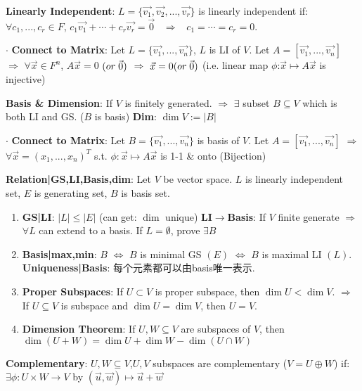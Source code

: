 \documentclass[9pt]{article}
\begin{document}
\textbf{Linearly Independent}: $L=\{\vec{v_1},\vec{v_2},...,\vec{v_r}\}$ is linearly independent if: \ $\forall c_1,...,c_r\in F$, $c_1\vec{v_1}+\cdots+c_r\vec{v_r}=\vec{0}$ \ $\Rightarrow$ \ $c_1=\cdots =c_r=0$.

$\cdot$ \textbf{Connect to Matrix}: {\footnotesize Let $L=\{\vec{v_1},...,\vec{v_n}\}$, $L$ is LI of $V$. Let $A=[\vec{v_1},...,\vec{v_n}]$ $\Rightarrow$ $\forall\vec{x}\in F^n$, $A\vec{x}=0$ ${\scriptsize (or \ \vec{0})}$ $\Rightarrow$ $\vec{x}=0 {\scriptsize (or \ \vec{0})}$ (i.e. linear map $\phi$:$\vec{x}\mapsto A\vec{x}$ is injective)}

\textbf{Basis \& Dimension}: If $V$ is finitely generated. $\Rightarrow$ $\exists$ subset $B\subseteq V$ which is both LI and GS. ($B$ is basis) \quad \textbf{Dim}: $\dim V:=|B|$

$\cdot$ \textbf{Connect to Matrix}: {\footnotesize Let $B=\{\vec{v_1},...,\vec{v_n}\}$ is basis of $V$. Let $A=[\vec{v_1},...,\vec{v_n}]$ $\Rightarrow$ $\forall\vec{x}=(x_1,...,x_n)^T$ s.t. $\phi:\vec{x}\mapsto A\vec{x}$ is 1-1 \& onto (Bijection)}

\textbf{Relation|GS,LI,Basis,dim}: {\small Let $V$ be vector space. $L$ is linearly independent set, $E$ is generating set, $B$ is basis set.}

\begin{enumerate}[itemsep=-2pt, topsep=-2pt]
    \item \textbf{GS|LI}: $|L|\leq|E|$ {\scriptsize (can get: $\dim$ unique)} \quad \textbf{LI$\to$Basis}: If $V$ finite generate $\Rightarrow$ $\forall L$ can extend to a basis. {\scriptsize If $L=\emptyset$, prove $\exists B$}
    \item \textbf{Basis|max,min}: $B$ $\Leftrightarrow$ $B$ is minimal GS $(E)$ $\Leftrightarrow$ $B$ is maximal LI $(L)$. \quad \textbf{Uniqueness|Basis}: {\small 每个元素都可以由basis唯一表示.}
    \item \textbf{Proper Subspaces}: {\small If $U\subset V$ is proper subspace, then $\dim U<\dim V$. \quad $\Rightarrow$ \quad If $U\subseteq V$ is subspace and $\dim U=\dim V$, then $U=V$.}
    \item \textbf{Dimension Theorem}: If $U,W\subseteq V$ are subspaces of $V$, then $\dim(U+W)=\dim U+\dim W-\dim(U\cap W)$
\end{enumerate}

\textbf{Complementary}: $U,W\subseteq V$,$U,V$ subspaces are complementary ($V=U\oplus W$) if: \quad $\exists\phi:U\times W\to V$ by $(\vec{u},\vec{w})\mapsto\vec{u}+\vec{w}$
\end{document}
